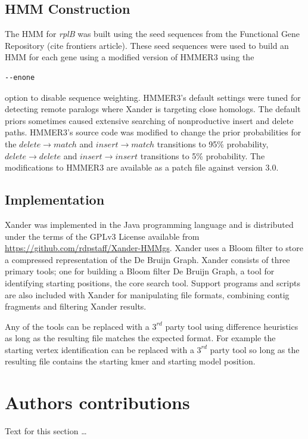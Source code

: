 \documentclass[10pt]{bmc_article}
\newenvironment{bmcformat}{\begin{raggedright}\baselineskip20pt\sloppy\setboolean{publ}{false}}{\end{raggedright}\baselineskip20pt\sloppy}
\begin{document}
\begin{bmcformat}
\subsection*{HMM Construction}
The HMM for \emph{rplB} was built using the seed sequences from the Functional Gene Repository (cite frontiers article).  These seed sequences were used to build an HMM for each gene using a modified version of HMMER3 using the \begin{verbatim}--enone\end{verbatim} option to disable sequence weighting. HMMER3's default settings were tuned for detecting remote paralogs\cite{johnson_division_2006} where Xander is targeting close homologs.  The default priors sometimes caused extensive searching of nonproductive insert and delete paths. HMMER3's source code was modified to change the prior probabilities for the $delete \rightarrow match$ and $insert \rightarrow match$ transitions to 95\% probability, $delete \rightarrow delete$ and $insert \rightarrow insert$ transitions to 5\% probability.  The modifications to HMMER3 are available as a patch file against version 3.0.

\subsection*{Implementation}
Xander was implemented in the Java programming language and is distributed under the terms of the GPLv3 License available from \url{https://github.com/rdpstaff/Xander-HMMgs}.  Xander uses a Bloom filter to store a compressed representation of the De Bruijn Graph. Xander consists of three primary tools; one for building a Bloom filter De Bruijn Graph, a tool for identifying starting positions, the core search tool. Support programs and scripts are also included with Xander for manipulating file formats, combining contig fragments and filtering Xander results.

Any of the tools can be replaced with a $3^{rd}$ party tool using difference heuristics as long as the resulting file matches the expected format.  For example the starting vertex identification can be replaced with a $3^{rd}$ party tool so long as the resulting file contains the starting kmer and starting model position.
    
\section*{Authors contributions}
    Text for this section \ldots


\end{bmcformat}
\end{document}
